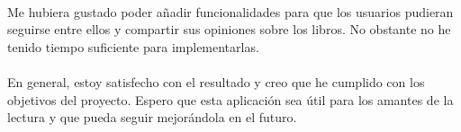 \documentclass[a4paper,12pt]{report}
\begin{document}
    \paragraph*{}{Me hubiera gustado poder añadir funcionalidades para que los usuarios pudieran seguirse entre ellos y compartir sus opiniones sobre los libros. No obstante no he tenido tiempo suficiente para implementarlas.}
    \paragraph*{}{En general, estoy satisfecho con el resultado y creo que he cumplido con los objetivos del proyecto. Espero que esta aplicación sea útil para los amantes de la lectura y que pueda seguir mejorándola en el futuro.}
\end{document}
